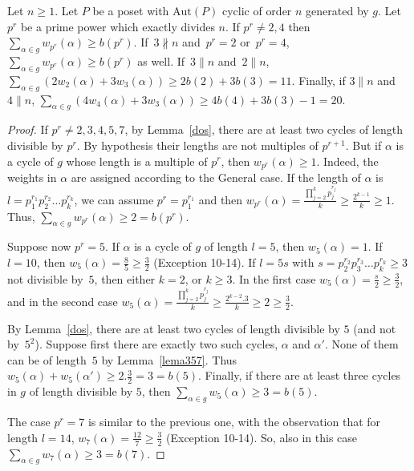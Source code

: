 \documentclass[ALCO,published]{cedram}
\renewcommand{\sigma}{g}
\newcommand{\aut}{\textrm{Aut}}
\begin{document}
\begin{teo} \label{main}
Let $n\ge 1$. Let $P$ be a poset with $\aut (P)$ cyclic of order $n$ generated by $g$. Let $p^r$ be a prime power which exactly divides $n$. If $p^r\neq 2,4$ then \mbox{$\sum\limits_{\alpha \in \sigma} w_{p^r}(\alpha)\ge b(p^r)$}. 
If~$3\nparallel n$ and~$p^r=2$ or~$p^r=4$, $\sum\limits_{\alpha \in \sigma} w_{p^r}(\alpha)\ge b(p^r)$ as well.
If~$3\parallel n$ and~$2\parallel n$, $\sum\limits_{\alpha \in \sigma} (2w_{2}(\alpha)+3w_{3}(\alpha))\ge 2b(2)+3b(3)=11$. Finally, if $3\parallel n$ and~$4\parallel n$, $\sum\limits_{\alpha \in \sigma} (4w_{4}(\alpha)+3w_{3}(\alpha))\ge 4b(4)+3b(3)-1=20$.
\end{teo}
\begin{proof}
If $p^r\neq 2,3,4,5,7$, by Lemma~\ref{dos}, there are at least two cycles of length divisible by $p^r$. By hypothesis their lengths are not multiples of $p^{r+1}$. But if $\alpha$ is a cycle of $\sigma$ whose length is a multiple of $p^r$, then $w_{p^r}(\alpha)\ge 1$. Indeed, the weights in $\alpha$ are assigned according to the General case. If the length of $\alpha$ is $l=p_1^{r_1}p_2^{r_2}\ldots p_k^{r_k}$, we can assume $p^r=p_1^{r_1}$ and then $w_{p^r}(\alpha)=\frac{\prod\limits_{j=2}^k p_j^{r_j}}{k}\ge \frac{2^{k-1}}{k}\ge 1$. Thus, $\sum\limits_{\alpha \in \sigma} w_{p^r}(\alpha)\ge 2= b(p^r)$.

Suppose now $p^r=5$. If $\alpha$ is a cycle of $\sigma$ of length $l=5$, then $w_5(\alpha)=1$. If $l=10$, then $w_5(\alpha)=\frac{8}{5}\ge \frac{3}{2}$ (Exception 10-14). If $l=5s$ with $s=p_2^{r_2}p_3^{r_3}\ldots p_k^{r_k}\ge 3$ not divisible by~$5$, then either $k=2$, or $k\ge 3$. In the first case $w_5(\alpha)=\frac{s}{2}\ge \frac{3}{2}$, and in the second case $w_5(\alpha)=\frac{\prod\limits_{j=2}^k p_j^{r_j}}{k}\ge \frac{2^{k-2}.3}{k}\ge 2\ge \frac{3}{2}$. 

By Lemma~\ref{dos}, there are at least two cycles of length divisible by $5$ (and not by~$5^2$). Suppose first there are exactly two such cycles, $\alpha$ and $\alpha'$. None of them can be of length~$5$ by Lemma~\ref{lema357}. Thus $w_5(\alpha)+w_5(\alpha')\ge 2. \frac{3}{2}= 3=b(5)$. Finally, if there are at least three cycles in $\sigma$ of length divisible by $5$, then $\sum\limits_{\alpha \in \sigma} w_{5}(\alpha)\ge 3= b(5)$.

The case $p^r=7$ is similar to the previous one, with the observation that for length $l=14$, $w_7(\alpha)=\frac{12}{7}\ge \frac{3}{2}$ (Exception 10-14). So, also in this case~$\sum\limits_{\alpha \in \sigma} w_{7}(\alpha)\ge 3= b(7)$.


\end{proof}
\end{document}

